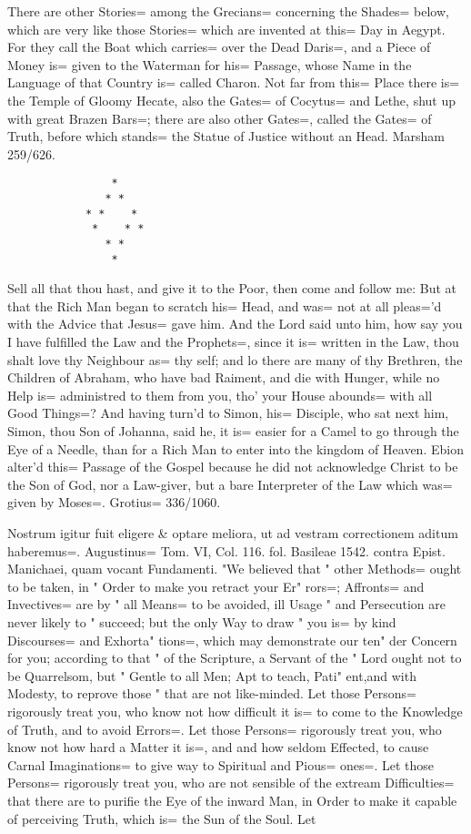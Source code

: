 There are other Stories= among the Grecians= concerning the Shades= below, which are very like those Stories= which are invented at this= Day in Aegypt.
For they call the Boat which carries= over the Dead Daris=, and a Piece of Money is= given to the Waterman for his= Passage, whose Name in the Language of that Country is= called Charon.
Not far from this= Place there is= the Temple of Gloomy Hecate, also the Gates= of Cocytus= and Lethe, shut up with great Brazen Bars=;
there are also other Gates=, called the Gates= of Truth, before which stands= the Statue of Justice without an Head.
Marsham 259/626.

\begin{verbatim}
                *
               * *
            * *    *
             *    * *
               * *
                *
\end{verbatim}

Sell all that thou hast, and give it to the Poor, then come and follow me:
But at that the Rich Man began to scratch his= Head, and was= not at all pleas='d with the Advice that Jesus= gave him.
And the Lord said unto him, how say you I have fulfilled the Law and the Prophets=, since it is= written in the Law, thou shalt love thy Neighbour as= thy self;
and lo there are many of thy Brethren, the Children of Abraham, who have bad Raiment, and die with Hunger, while no Help is= administred to them from you, tho' your House abounds= with all Good Things=?
And having turn'd to Simon, his= Disciple, who sat next him, Simon, thou Son of Johanna, said he, it is= easier for a Camel to go through the Eye of a Needle, than for a Rich Man to enter into the kingdom of Heaven.
Ebion alter'd this= Passage of the Gospel because he did not acknowledge Christ to be the Son of God, nor a Law-giver, but a bare Interpreter of the Law which was= given by Moses=.
Grotius= 336/1060.

Nostrum igitur fuit eligere \& optare meliora, ut ad vestram correctionem aditum haberemus=.
Augustinus= Tom.
VI, Col.
116.
fol.
Basileae 1542.
contra Epist.
Manichaei, quam vocant Fundamenti.
"We believed that
" other Methods= ought to be taken, in
" Order to make you retract your Er" rors=;
Affronts= and Invectives= are by
" all Means= to be avoided, ill Usage
" and Persecution are never likely to
" succeed;
but the only Way to draw
" you is= by kind Discourses= and Exhorta" tions=, which may demonstrate our ten" der Concern for you;
according to that
" of the Scripture, a Servant of the
" Lord ought not to be Quarrelsom, but
" Gentle to all Men;
Apt to teach, Pati" ent,and with Modesty, to reprove those
" that are not like-minded.
Let those Persons= rigorously treat you, who know not how difficult it is= to come to the Knowledge of Truth, and to avoid Errors=.
Let those Persons= rigorously treat you, who know not how hard a Matter it is=, and and how seldom Effected, to cause Carnal Imaginations= to give way to Spiritual and Pious= ones=.
Let those Persons= rigorously treat you, who are not sensible of the extream Difficulties= that there are to purifie the Eye of the inward Man, in Order to make it capable of perceiving Truth, which is= the Sun of the Soul.
Let

